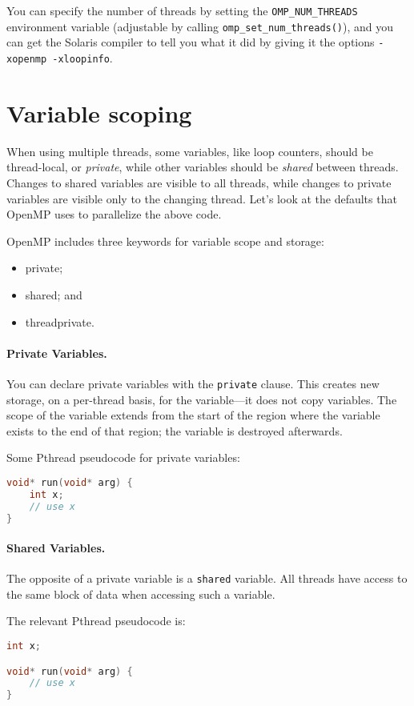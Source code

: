You can specify the number of threads by setting the
\verb+OMP_NUM_THREADS+ environment variable (adjustable by calling 
\verb+omp_set_num_threads()+), and you can get the
Solaris compiler to tell you what it did by giving it the
options \verb+-xopenmp -xloopinfo+.

\section*{Variable scoping}
When using multiple threads, some variables, like loop counters,
should be thread-local, or \emph{private}, while other variables
should be \emph{shared} between threads. Changes to shared variables
are visible to all threads, while changes to private variables are
visible only to the changing thread. Let's look at the defaults that
OpenMP uses to parallelize the above code.


OpenMP includes three keywords for variable scope and storage:
\begin{itemize}
        \item private;
        \item shared; and
        \item threadprivate.
\end{itemize}

\paragraph{Private Variables.} You can declare private variables
with the {\tt private} clause. This creates new storage, on a per-thread
basis, for the variable---it does not copy variables. The scope
of the variable extends from the start of the region where the variable
exists to the end of that region; the variable is destroyed afterwards.

Some Pthread pseudocode for private variables:

  \begin{lstlisting}[language=C]
void* run(void* arg) {
    int x;
    // use x
}
  \end{lstlisting}

\paragraph{Shared Variables.} The opposite of a private variable
is a {\tt shared} variable. All threads have access to the same block
of data when accessing such a variable.

The relevant Pthread pseudocode is:
  \begin{lstlisting}[language=C]
int x;

void* run(void* arg) {
    // use x
}
  \end{lstlisting}

